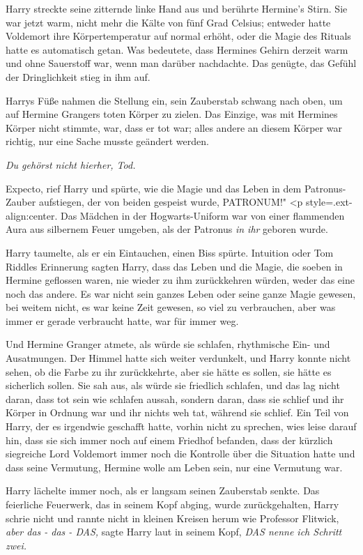 Harry streckte seine zitternde linke Hand aus und berührte Hermine's Stirn. Sie
war jetzt warm, nicht mehr die Kälte von fünf Grad Celsius; entweder hatte
Voldemort ihre Körpertemperatur auf normal erhöht, oder die Magie des Rituals
hatte es automatisch getan. Was bedeutete, dass Hermines Gehirn derzeit warm und
ohne Sauerstoff war, wenn man darüber nachdachte. Das genügte, das Gefühl der
Dringlichkeit stieg in ihm auf.

Harrys Füße nahmen die Stellung ein, sein Zauberstab schwang nach oben, um auf
Hermine Grangers toten Körper zu zielen. Das Einzige, was mit Hermines Körper
nicht stimmte, war, dass er tot war; alles andere an diesem Körper war richtig,
nur eine Sache musste geändert werden.

\emph{Du gehörst nicht hierher, Tod.}

\glqq{}Expecto\grqq{}, rief Harry und spürte, wie die Magie und das Leben in dem
Patronus-Zauber aufstiegen, der von beiden gespeist wurde, \glqq{}PATRONUM!" <p
style=\grqq{}.ext-align:center\grqq{}. Das Mädchen in der Hogwarts-Uniform war
von einer flammenden Aura aus silbernem Feuer umgeben, als der Patronus\emph{ in
ihr} geboren wurde.

Harry taumelte, als er ein Eintauchen, einen Biss spürte. Intuition oder Tom
Riddles Erinnerung sagten Harry, dass das Leben und die Magie, die soeben in
Hermine geflossen waren, nie wieder zu ihm zurückkehren würden, weder das eine
noch das andere. Es war nicht sein ganzes Leben oder seine ganze Magie gewesen,
bei weitem nicht, es war keine Zeit gewesen, so viel zu verbrauchen, aber was
immer er gerade verbraucht hatte, war für immer weg.

Und Hermine Granger atmete, als würde sie schlafen, rhythmische Ein- und
Ausatmungen. Der Himmel hatte sich weiter verdunkelt, und Harry konnte nicht
sehen, ob die Farbe zu ihr zurückkehrte, aber sie hätte es sollen, sie hätte es
sicherlich sollen. Sie sah aus, als würde sie friedlich schlafen, und das lag
nicht daran, dass tot sein wie schlafen aussah, sondern daran, dass sie schlief
und ihr Körper in Ordnung war und ihr nichts weh tat, während sie schlief. Ein
Teil von Harry, der es irgendwie geschafft hatte, vorhin nicht zu sprechen, wies
leise darauf hin, dass sie sich immer noch auf einem Friedhof befanden, dass der
kürzlich siegreiche Lord Voldemort immer noch die Kontrolle über die Situation
hatte und dass seine Vermutung, Hermine wolle am Leben sein, nur eine Vermutung
war.

Harry lächelte immer noch, als er langsam seinen Zauberstab senkte. Das
feierliche Feuerwerk, das in seinem Kopf abging, wurde zurückgehalten, Harry
schrie nicht und rannte nicht in kleinen Kreisen herum wie Professor Flitwick,
\emph{aber das - das - DAS,} sagte Harry laut in seinem Kopf,\emph{ DAS nenne
ich Schritt zwei.}

